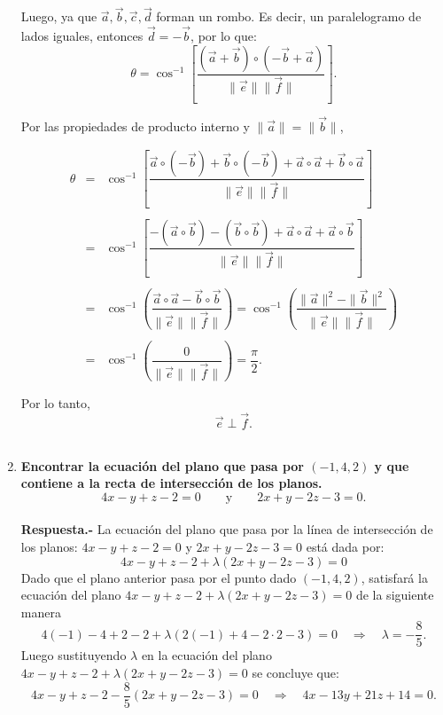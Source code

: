 \begin{enumerate}
	    Luego, ya que $\vec{a},\vec{b},\vec{c},\vec{d}$ forman un rombo. Es decir, un paralelogramo de lados iguales, entonces $\vec{d}=-\vec{b}$, por lo que:
	    $$\theta = \cos^{-1}\left[\dfrac{(\vec{a}+\vec{b})\circ(-\vec{b}+\vec{a})}{\|\vec{e}\|\|\vec{f}\|}\right].$$

	    Por las propiedades de producto interno y $\|\vec{a}\|=\|\vec{b}\|$,

	    $$\begin{array}{rcl}
		\theta&=&\cos^{-1}\left[\dfrac{\vec{a}\circ (-\vec{b})+ \vec{b}\circ(-\vec{b})+ \vec{a}\circ \vec{a}+ \vec{b}\circ \vec{a}}{\|\vec{e}\|\|\vec{f}\|}\right]\\\\
		      &=&\cos^{-1}\left[\dfrac{-(\vec{a}\circ \vec{b})- (\vec{b}\circ \vec{b}) + \vec{a}\circ \vec{a}+ \vec{a}\circ \vec{b}}{\|\vec{e}\|\|\vec{f}\|}\right]\\\\
		      &=&\cos^{-1}\left(\dfrac{ \vec{a}\circ \vec{a}- \vec{b}\circ \vec{b}}{\|\vec{e}\|\|\vec{f}\|}\right)=\cos^{-1}\left(\dfrac{\|\vec{a}\|^2-\|\vec{b}\|^2}{\|\vec{e}\|\|\vec{f}\|}\right)\\\\
		      &=& \cos^{-1}\left(\dfrac{0}{\|\vec{e}\|\|\vec{f}\|}\right) = \dfrac{\pi}{2}.\\\\
	    \end{array}$$
	    Por lo tanto,
	    $$\vec{e}\perp \vec{f}.$$\\


\item \textbf{\boldmath Encontrar la ecuación del plano que pasa por $(-1,4,2)$ y que contiene a la recta de intersección de los planos.
    $$4x-y+z-2=0 \qquad \mbox{y}\qquad 2x+y-2z-3=0.$$\\
    Respuesta.-}\; La ecuación del plano que pasa por la línea de intersección de los planos: $4x-y+z-2=0$ y $2x+y-2z-3=0$ está dada por:
    $$4x-y+z-2+\lambda(2x+y-2z-3)=0$$
    Dado que el plano anterior pasa por el punto dado $(-1,4,2)$, satisfará la ecuación del plano $4x-y+z-2+\lambda(2x+y-2z-3)=0$ de la siguiente manera
    $$4(-1)-4+2-2+\lambda(2(-1)+4-2\cdot 2-3)=0 \quad \Rightarrow \quad \lambda =-\dfrac{8}{5}.$$
    Luego sustituyendo $\lambda$ en la ecuación del plano $4x-y+z-2+\lambda(2x+y-2z-3)=0$ se concluye que:
    $$4x-y+z-2-\dfrac{8}{5}(2x+y-2z-3)=0 \quad \Rightarrow \quad 4x-13y+21z+14=0.$$\\


\end{enumerate}
